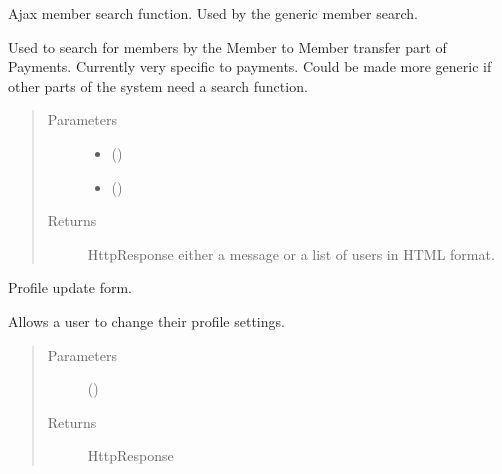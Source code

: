 \documentclass[letterpaper,10pt,english]{sphinxmanual}
\begin{document}
\begin{fulllineitems}
\label{\detokenize{accounts:accounts.views.member_search_ajax}}
Ajax member search function. Used by the generic member search.

Used to search for members by the Member to Member transfer part of Payments.
Currently very specific to payments. Could be made more generic if other
parts of the system need a search function.
\begin{quote}\begin{description}
\item[{Parameters}] \leavevmode\begin{itemize}
\item {} 
 () \textendash{} 

\item {} 
 () \textendash{} 

\end{itemize}

\item[{Returns}] \leavevmode
HttpResponse \sphinxhyphen{} either a message or a list of users in HTML format.

\end{description}\end{quote}

\end{fulllineitems}


\begin{fulllineitems}
\label{\detokenize{accounts:accounts.views.profile}}
Profile update form.

Allows a user to change their profile settings.
\begin{quote}\begin{description}
\item[{Parameters}] \leavevmode
{} () \textendash{} 

\item[{Returns}] \leavevmode
HttpResponse

\end{description}\end{quote}

\end{fulllineitems}
\end{document}
